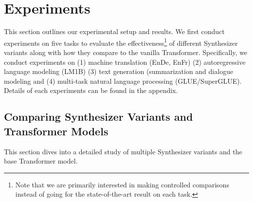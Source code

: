 \documentclass{article} \usepackage{iclr2021_conference,times}
\begin{document}
\section{Experiments}
This section outlines our experimental setup and results. We first conduct experiments on five tasks to evaluate the effectiveness\footnote{Note that we are primarily interested in making controlled comparisons instead of going for the state-of-the-art result on each task.} of different Synthesizer variants along with how they compare to the vanilla Transformer. Specifically, we conduct experiments on (1) machine translation (EnDe, EnFr) (2) autoregressive language modeling (LM1B) (3) text generation (summarization and dialogue modeling and (4) multi-task natural language processing (GLUE/SuperGLUE). Details of each experiments can be found in the appendix. 

















\subsection{Comparing Synthesizer Variants and Transformer Models}
This section dives into a detailed study of multiple Synthesizer variants and the base Transformer model. 
\end{document}
